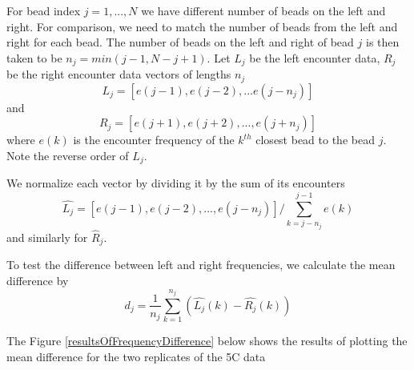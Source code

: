 \documentclass[12pt]{paper}
\begin{document}
For bead index $j=1,...,N$ we have different number of beads on the left and right. For comparison, we need to match the number of beads from the left and right for each bead. The number of beads on the left and right of bead $j$ is then taken to be $n_j=min(j-1,N-j+1)$. 
Let $L_j$ be the left encounter data, $R_j$ be the right encounter data vectors of lengths $n_j$
\begin{equation*}
L_j=\left[e(j-1),e(j-2),...e(j-n_j)\right] 
\end{equation*}
and 
\begin{equation*}
R_j=\left[e(j+1), e(j+2),...,e(j+n_j)\right]
\end{equation*}
where $e(k)$ is the encounter frequency of the $k^{th}$ closest bead to the bead $j$. Note the reverse order of $L_j$.

We normalize each vector by dividing it by the sum of its encounters
\begin{equation*}
\hat{L_j} =\left[e(j-1),e(j-2),...,e(j-n_j)\right]/\sum_{k=j-n_j}^{j-1}e(k)
\end{equation*}
and similarly for $\hat{R}_j$.

To test the difference between left and right frequencies, we calculate the mean difference by 
\begin{equation*}
d_j=\frac{1}{n_j}\sum_{k=1}^{n_j} \left(\hat{L_j}(k)-\hat{R_j}(k)\right)
\end{equation*}

The Figure \ref{resultsOfFrequencyDifference} below shows the results of plotting the mean difference for the two replicates of the 5C data 
\end{document}
